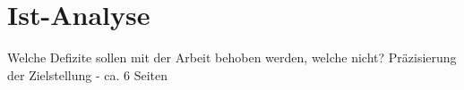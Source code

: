 \chapter{Ist-Analyse}
\thispagestyle{fancy}

Welche Defizite sollen mit der Arbeit behoben werden, welche nicht? Präzisierung der Zielstellung - ca. 6 Seiten